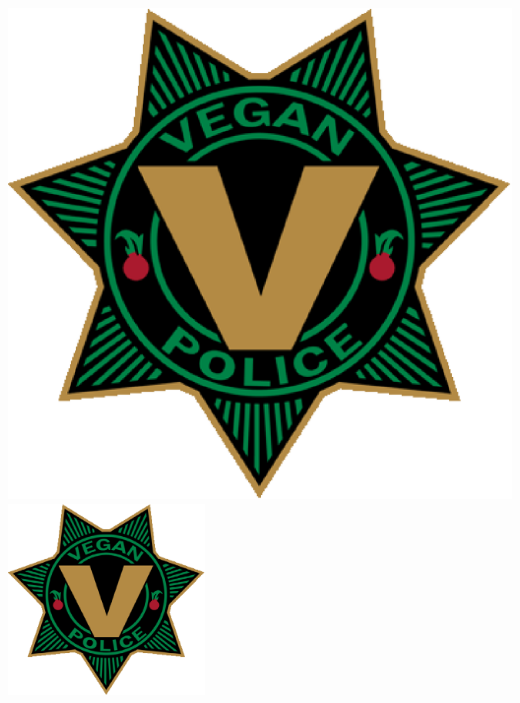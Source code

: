 \documentclass[a4paper,oneside,10pt]{article}
\begin{document}
\includegraphics[scale=0.75]{images/vegan_police.eps}
\includegraphics[angle=45,width=52mm]{images/vegan_police.eps}
\end{document}
